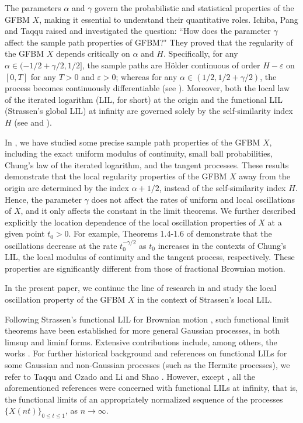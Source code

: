 \documentclass[11pt, reqno]{amsart}
\numberwithin{equation}{section}
\newcommand{\1}{{\bf 1}}
\newcommand{\2}{{\bf 2}}
\begin{document}
The parameters $\alpha$ and $\gamma$ govern the probabilistic 
and statistical properties of the GFBM $X$, making it essential to understand their quantitative roles.  Ichiba, Pang  and Taqqu \cite{IPT2021} raised and investigated the question:  ``How does the  parameter $\gamma$ affect the sample path properties of GFBM?"    
 {They proved that the regularity of the GFBM $X$ depends critically on $\alpha$ and $H$. Specifically, for any $\alpha \in (-1/2 + \gamma/2, 1/2]$, the sample paths are H\"older continuous of order $H - \varepsilon$ on $[0, T]$ for any $T>0$ and $\varepsilon>0$; whereas for any $\alpha \in (1/2, 1/2 + \gamma/2)$, the process becomes continuously differentiable (see \cite[Theorems 3.1 and  4.1]{IPT2021}).} Moreover, both the local law of the iterated logarithm (LIL, for short) at the origin and the functional LIL (Strassen's global LIL) at infinity are governed solely by the self-similarity index $H$ (see \cite[Theorems 5.1, 6.1]{IPT2021} and \cite[Proposition 7.1]{WX2021a}). 

In \cite{WX2021a, WX2021b}, we have  %
studied some precise sample path properties of the GFBM $X$, 
including the exact uniform modulus of continuity, small ball 
probabilities, Chung's law of the iterated logarithm, and
the tangent processes.  These results demonstrate that the 
local regularity properties of the GFBM $X$ away from the 
origin are determined by the index $\alpha + 1/2$, instead of 
the self-similarity index $H$. Hence, the parameter $\gamma$ 
does not affect the rates of uniform and local oscillations of $X$, and it only affects the constant in the limit theorems.
We further described explicitly the location dependence of the local oscillation properties of $X$ at a given point $t_0>0$. 
For example,  Theorems 1.4-1.6 of \cite{WX2021a} demonstrate  that the oscillations decrease
at the rate $t_0^{-\gamma/2}$ as $t_0$ increases in the 
contexts of Chung's LIL, the local modulus of continuity
and the tangent process,  respectively.  These properties are 
significantly different from those of fractional Brownian motion.

In the present paper, we continue the line of research in 
\cite{IPT2021, IPT2020b, WX2021a, WX2021b} and study the 
local oscillation property of the GFBM $X$ in the context of
Strassen's local LIL. 

Following Strassen's functional LIL for Brownian motion
\cite{Strassen},  such functional limit theorems have been established for more general Gaussian processes, in both limsup and liminf forms. 
Extensive contributions include, among others, the works  \cite{Arc95, 
Gantert, HL2005,IPT2021, KLT, LWH2006, MR1995, Oodaira72, 
Oodaira73, Revesz, Wang2005, WSX2020}. For further historical
background and references on functional LILs for some Gaussian 
and non‑Gaussian processes (such as the Hermite processes), we 
refer to Taqqu and Czado \cite{TC1985} and Li and Shao
\cite{LS2001}. However, except  \cite{Gantert, WSX2020}, all the aforementioned references were concerned with functional
LILs at infinity,  that is, the functional limits of an 
appropriately normalized sequence of the processes 
$\{X(nt)\}_{0\le t \le 1}$, as $n \to \infty$.
  
\end{document}

